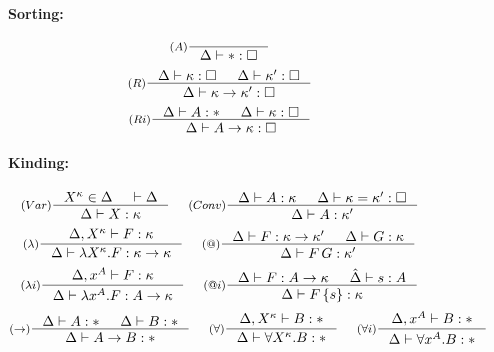 \begin{figure}
\begin{minipage}{.5\textwidth}
\paragraph{Sorting:}
\[ \inference[($A$)]{}{\Delta |- *:\square} \]
\[ \inference[($R$)]{\Delta |- \kappa:\square & \Delta |- \kappa':\square}
                    {\Delta |- \kappa -> \kappa' : \square}
\]\vspace*{.2em}
\[ \inference[($Ri$)]{\Delta |- A:* & \Delta |- \kappa:\square}
                     {\Delta |- A -> \kappa : \square}
\]
\end{minipage}

\paragraph{Kinding:}
\[ \inference[($Var$)]{X^\kappa\in\Delta & |- \Delta}
                       {\Delta |- X : \kappa}
 ~~~~
   \inference[($Conv$)]{ \Delta |- A : \kappa
                       & \Delta |- \kappa = \kappa' : \square }
                       {\Delta |- A : \kappa'}
\]
\[
   \inference[($\lambda$)]{\Delta,X^\kappa |- F : \kappa}
                          {\Delta |- \lambda X^\kappa.F : \kappa->\kappa}
 ~~~~
 \inference[($@$)]{ \Delta |- F : \kappa -> \kappa'
                      & \Delta |- G : \kappa }
                      {\Delta |- F\,G : \kappa'}
\]
\[ \inference[($\lambda i$)]{\Delta,x^A |- F : \kappa}
                            {\Delta |- \lambda x^A.F : A->\kappa}
 ~~~~
   \inference[($@i$)]{ \Delta |- F : A -> \kappa
                     & \hat\Delta |- s : A }
                     {\Delta |- F\,\{s\} : \kappa}
\]
\[ \inference[($->$)]{\Delta |- A : * & \Delta |- B : *}
                     {\Delta |- A -> B : * }
 ~~~~
   \inference[($\forall$)]{\Delta, X^\kappa |- B : *}
                            {\Delta |- \forall X^\kappa . B : *}
 ~~~~
   \inference[($\forall i$)]{\Delta, x^A |- B : *}
                              {\Delta |- \forall x^A . B : *}
\]


\end{figure}
